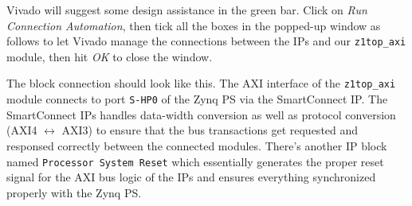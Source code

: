 \documentclass[11pt]{article}
\begin{document}
\begin{appendices}
\begin{center}
\end{center}

Vivado will suggest some design assistance in the green bar. Click on \emph{Run Connection Automation}, then tick all the boxes in the popped-up window as follows to let Vivado manage the connections between the IPs and our \verb|z1top_axi| module, then hit \emph{OK} to close the window.

\begin{center}
\end{center}

The block connection should look like this. The AXI interface of the \verb|z1top_axi| module connects to port \texttt{S-HP0} of the Zynq PS via the SmartConnect IP. The SmartConnect IPs handles data-width conversion as well as protocol conversion (AXI4 $\leftrightarrow$ AXI3) to ensure that the bus transactions get requested and responsed correctly between the connected modules. There's another IP block named \texttt{Processor System Reset} which essentially generates the proper reset signal for the AXI bus logic of the IPs and ensures everything synchronized properly with the Zynq PS.


\end{appendices}
\end{document}
